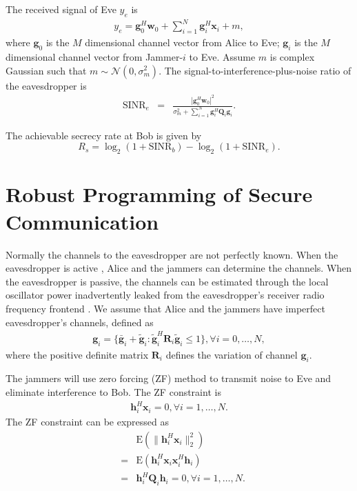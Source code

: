 \documentclass[conference]{IEEEtran}
\begin{document}
The received signal of Eve $y_e$ is
\begin{eqnarray}
y_e = \mathbf{g}_0^H\mathbf{w}_0 + \sum_{i = 1}^N\mathbf{g}_i^H\mathbf{x}_i + m,
\end{eqnarray}
where $\mathbf{g}_0$ is the $M$ dimensional channel vector from Alice to Eve; $\mathbf{g}_i$ is the $M$ dimensional channel vector from Jammer-$i$ to Eve.   Assume $m$ is complex Gaussian such that $m \sim \mathcal{N}(0,\sigma_m^2)$.
The signal-to-interference-plus-noise ratio of the eavesdropper is
\begin{eqnarray}
\mathrm{SINR}_e &=& \frac{\left| \mathbf{g}_{0}^H\mathbf{w}_{0}\right|^2}{\sigma_m^2 + \sum_{i=1}^{N}\mathbf{g}_{i}^H\mathbf{Q}_{i}\mathbf{g}_i} \label{eq:secure_capacity}.
\end{eqnarray}

The achievable secrecy rate at Bob is given by \cite{6728676}
\begin{equation}
R_s = \log_2\left(1 + \mathrm{SINR}_b\right)-\log_2\left(1 + \mathrm{SINR}_e\right).
\end{equation}


\section{Robust Programming of Secure Communication} \label{sec:robust programming}
Normally the channels to the eavesdropper are not perfectly known. When the eavesdropper is active \cite{gopala2008secrecy,feng_miso}, Alice and the jammers can determine the channels. When the eavesdropper is passive, the channels can be estimated through the local oscillator power inadvertently leaked from the eavesdropper's receiver radio frequency frontend \cite{mukherjee2012detecting,feng_miso}. We assume that  Alice and the jammers have imperfect eavesdropper's channels, defined as 
\begin{eqnarray}
\mathbf{g}_i = \{\bar{\mathbf{g}}_i + \tilde{\mathbf{g}}_i: \tilde{\mathbf{g}}_i^H \mathbf{R}_i\tilde{\mathbf{g}}_i \leq 1\},\forall i = 0,\ldots, N,
\end{eqnarray}
where the positive definite  matrix $\mathbf{R}_i $ defines the variation of channel $\mathbf{g}_i$. 

The jammers will use zero forcing (ZF) method to transmit noise to Eve and eliminate interference to Bob.
The ZF constraint is 
\begin{eqnarray}
\mathbf{h}_i^H\mathbf{x}_i =0 , \forall i = 1,\dots, N\label{eq:ZF_constraint}.
\end{eqnarray}
The ZF constraint can be expressed as
\begin{eqnarray}
&&\mathrm{E}(\|\mathbf{h}_i^H\mathbf{x}_i\|_2^2)\nonumber\\
&=&\mathrm{E}(\mathbf{h}_i^H\mathbf{x}_i\mathbf{x}_i^H\mathbf{h}_i)\nonumber\\
&=&\mathbf{h}_i^H\mathbf{Q}_i \mathbf{h}_i = 0, \forall i = 1,\ldots,N \label{eq:ZF_constraint_relaxed}.
\end{eqnarray}
\end{document}
